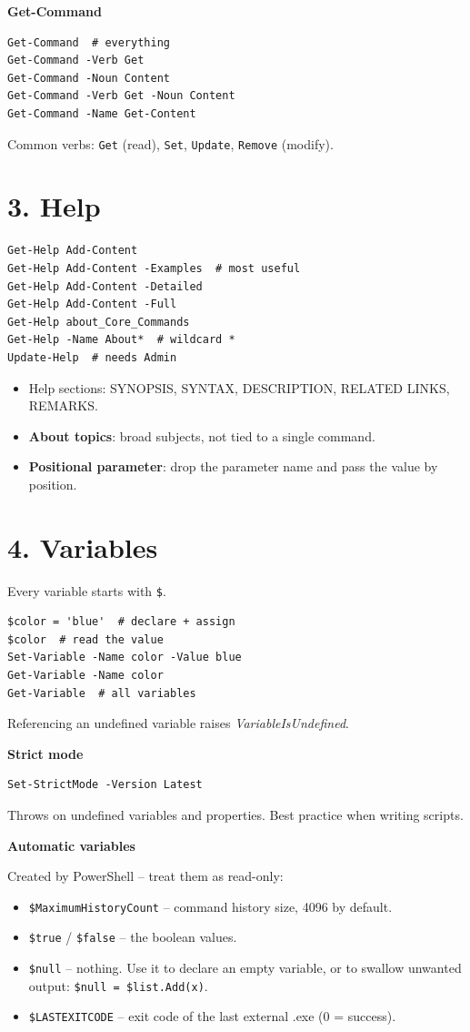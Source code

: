 \textbf{Get-Command}

\begin{verbatim}
Get-Command  # everything
Get-Command -Verb Get
Get-Command -Noun Content
Get-Command -Verb Get -Noun Content
Get-Command -Name Get-Content
\end{verbatim}
Common verbs: \texttt{Get} (read), \texttt{Set}, \texttt{Update}, \texttt{Remove} (modify).

\section{3. Help}
\begin{verbatim}
Get-Help Add-Content
Get-Help Add-Content -Examples  # most useful
Get-Help Add-Content -Detailed
Get-Help Add-Content -Full
Get-Help about_Core_Commands
Get-Help -Name About*  # wildcard *
Update-Help  # needs Admin
\end{verbatim}
\begin{itemize}
\item Help sections: SYNOPSIS, SYNTAX, DESCRIPTION, RELATED LINKS, REMARKS.
\item \textbf{About topics}: broad subjects, not tied to a single command.
\item \textbf{Positional parameter}: drop the parameter name and pass the value by position.
\end{itemize}

\section{4. Variables}
Every variable starts with \texttt{\$}.
\begin{verbatim}
$color = 'blue'  # declare + assign
$color  # read the value
Set-Variable -Name color -Value blue
Get-Variable -Name color
Get-Variable  # all variables
\end{verbatim}
Referencing an undefined variable raises \emph{VariableIsUndefined}.

\textbf{Strict mode}

\begin{verbatim}
Set-StrictMode -Version Latest
\end{verbatim}
Throws on undefined variables and properties. Best practice when writing scripts.

\textbf{Automatic variables}

Created by PowerShell -- treat them as read-only:
\begin{itemize}
\item \texttt{\$MaximumHistoryCount} -- command history size, 4096 by default.
\item \texttt{\$true} / \texttt{\$false} -- the boolean values.
\item \texttt{\$null} -- nothing. Use it to declare an empty variable, or to swallow unwanted output: \texttt{\$null = \$list.Add(x)}.
\item \texttt{\$LASTEXITCODE} -- exit code of the last external .exe (0 = success).
\end{itemize}

